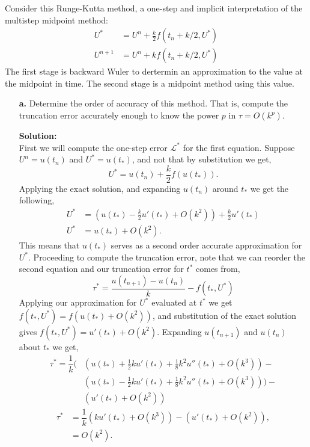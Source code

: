 \documentclass[12pt]{article}
\makeatletter
\theoremstyle{homework}
\newenvironment{exercise}[1]
{\def\@currentlabel{#1}\exercisecore}
{\endexercisecore}
\newcommand{\localhead}[1]{\par\smallskip\noindent\textbf{#1}\nobreak\\}%
\newcommand\solution{\localhead{Solution:}}
\makeatother
\begin{document}
\begin{exercise}{Problem P31} Consider this Runge-Kutta method, a one-step and implicit interpretation of the multistep midpoint method:
  \begin{align*}
    U^* &= U^n + \frac{k}{2}f(t_n + k/2, U^*)\\
    U^{n + 1} &= U^n + kf(t_n + k/2, U^*)
  \end{align*}
  The first stage is backward Wuler to dertermin an approximation to the value at the midpoint in time. The second stage is a midpoint method 
  using this value. 
  \begin{enumerate}
    \item[\textbf{a.}] Determine the order of accuracy of this method. That is, compute the truncation error accurately enough to know
    the power $p$ in $\tau = O(k^p)$. 
    \solution First we will compute the one-step error $\mathcal{L}^*$ for the first equation. Suppose $U^n = u(t_n)$ and $U^* = u(t_*)$, and 
    not that by substitution we get, 
    \begin{equation*}
      U^* = u(t_n) + \frac{k}{2}f(u(t_*)). 
    \end{equation*}
    Applying the exact solution, and expanding $u(t_n)$ around $t_*$ we get the following, 
    \begin{align*}
      U^* &= \left(u(t_*) - \frac{k}{2}u'(t_*) + O(k^2)\right) + \frac{k}{2}u'(t_*)\\
      U^* &= u(t_*) + O(k^2).
    \end{align*}
    This means that $u(t_*)$ serves as a second order accurate approximation for $U^*$. 
    Proceeding to compute the truncation error, note that we can reorder the second equation 
    and our truncation error for $t^*$ comes from, 
    \begin{equation*}
        \tau^* = \dfrac{u(t_{n + 1}) - u(t_{n})}{k} - f(t_*, U^*)
    \end{equation*}
    Applying our approximation for $U^*$ evaluated at $t^*$ we get $f(t_*, U^*) = f(u(t_*) + O(k^2))$, and substitution of the exact solution
    gives $f(t_*, U^*) = u'(t_*) + O(k^2)$. Expanding $u(t_{n + 1})$ and $u(t_n)$ about $t_*$ we get, 
    \begin{align*}
      \tau^* = \dfrac{1}{k}\biggl( &\left(u(t_*) + \frac{1}{2}ku'(t_*) + \frac{1}{8}k^2u''(t_*) + O(k^3) \right) -\\ 
      &\left(u(t_*) - \frac{1}{2}ku'(t_*) + \frac{1}{8}k^2u''(t_*) + O(k^3) \right)\biggr) - \\
      &(u'(t_*) + O(k^2))
    \end{align*}
    \begin{align*}
      \tau^* &= \dfrac{1}{k}\left(ku'(t_*) + O(k^3)\right) - (u'(t_*) + O(k^2)),\\
       &= O(k^2).
    \end{align*}



\end{enumerate}
\end{exercise}
\end{document}
